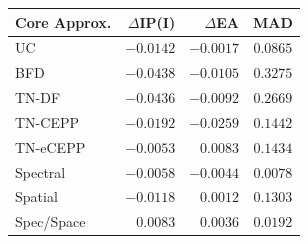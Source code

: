 \begin{frame}
{\begin{columns}
\begin{column}{0.5\textwidth}
    \small
    \begin{tabular}{lrrc}
     \hline
     \hline
     Core Approx. & $\Delta$IP(I) & $\Delta$EA & MAD \\
     \hline
     UC          & $ -0.0142 $ & $ -0.0017 $ & $ 0.0865 $ \\  
     BFD         & $ -0.0438 $ & $ -0.0105 $ & $ 0.3275 $ \\ 
     TN-DF       & $ -0.0436 $ & $ -0.0092 $ & $ 0.2669 $ \\
     TN-CEPP     & $ -0.0192 $ & $ -0.0259 $ & $ 0.1442 $ \\
     TN-eCEPP    & $ -0.0053 $ & $  0.0083 $ & $ 0.1434 $ \\
     \hline
     \color{darkblue} Spectral    & \color{darkblue}$ -0.0058 $ & \color{darkblue}$ -0.0044 $ & \color{darkblue}$ 0.0078 $ \\
     Spatial     & $ -0.0118 $ & $  0.0012 $ & $ 0.1303 $ \\
     Spec/Space  & $  0.0083 $ & $  0.0036 $ & $ 0.0192 $ \\
     \hline
     \hline
    \end{tabular}
    \end{column}
    \begin{column}{0.5\textwidth}
      \begin{figure}
        \centering
        \vspace*{-0.05\textheight}
      \end{figure}
    \end{column}
  \end{columns}
  }
\end{frame}

